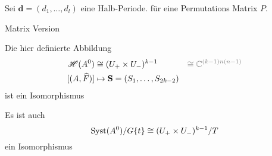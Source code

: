 \begin{frame}[t]
  \begin{lem}
    Sei $\textbf{d}=(d_1,\dots,d_l)$ eine Halb-Periode.
    für eine Permutations Matrix $P$.
  \end{lem}
\end{frame}
\begin{frame}{Matrix Version}
  \begin{tthm}
    Die hier definierte Abbildung
    \begin{align*}
      \sH(A^0)&\cong(U_+\times U_-)^{k-1}
      &\textcolor{gray}{\cong\C^{(k-1)n(n-1)}}
    \\ [(A,\hat F)]&\mapsto\textbf{S}=(S_1,\dots,S_{2k-2})
    \end{align*}
    ist ein Isomorphismus
    \begin{cor}
      Es ist auch 
      \[
        \operatorname{Syst}(A^0)/G\{t\}\cong(U_+\times U_-)^{k-1}/T
      \]
      ein Isomorphismus
    \end{cor}
  \end{tthm}
\end{frame}
